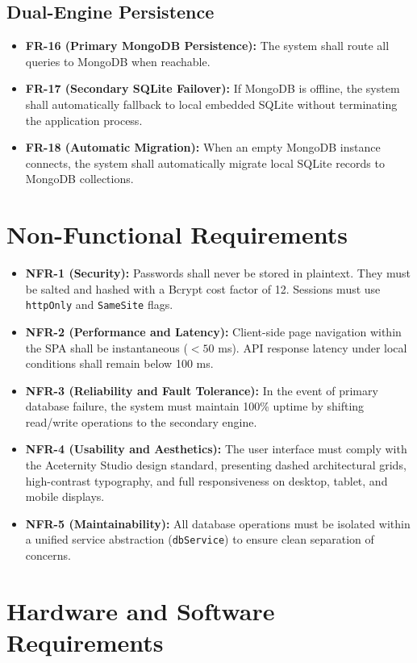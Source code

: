 \subsection{Dual-Engine Persistence}
\begin{itemize}
    \item \textbf{FR-16 (Primary MongoDB Persistence):} The system shall route all queries to MongoDB when reachable.
    \item \textbf{FR-17 (Secondary SQLite Failover):} If MongoDB is offline, the system shall automatically fallback to local embedded SQLite without terminating the application process.
    \item \textbf{FR-18 (Automatic Migration):} When an empty MongoDB instance connects, the system shall automatically migrate local SQLite records to MongoDB collections.
\end{itemize}

\section{Non-Functional Requirements}
\begin{itemize}
    \item \textbf{NFR-1 (Security):} Passwords shall never be stored in plaintext. They must be salted and hashed with a Bcrypt cost factor of 12. Sessions must use \texttt{httpOnly} and \texttt{SameSite} flags.
    \item \textbf{NFR-2 (Performance and Latency):} Client-side page navigation within the SPA shall be instantaneous ($<50$ ms). API response latency under local conditions shall remain below 100 ms.
    \item \textbf{NFR-3 (Reliability and Fault Tolerance):} In the event of primary database failure, the system must maintain 100\% uptime by shifting read/write operations to the secondary engine.
    \item \textbf{NFR-4 (Usability and Aesthetics):} The user interface must comply with the Aceternity Studio design standard, presenting dashed architectural grids, high-contrast typography, and full responsiveness on desktop, tablet, and mobile displays.
    \item \textbf{NFR-5 (Maintainability):} All database operations must be isolated within a unified service abstraction (\texttt{dbService}) to ensure clean separation of concerns.
\end{itemize}

\section{Hardware and Software Requirements}

